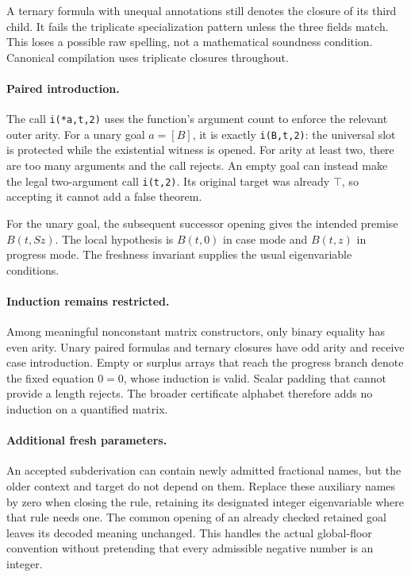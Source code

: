 \documentclass[11pt,letterpaper]{article}
\theoremstyle{definition}
\theoremstyle{remark}
\begin{document}
A ternary formula with unequal annotations still denotes the closure
of its third child.  It fails the triplicate specialization pattern
unless the three fields match.  This loses a possible raw spelling,
not a mathematical soundness condition.  Canonical compilation uses
triplicate closures throughout.

\paragraph{Paired introduction.}
The call \texttt{i(*a,t,2)} uses the function's argument count to enforce
the relevant outer arity.  For a unary goal $a=[B]$, it is exactly
\texttt{i(B,t,2)}: the universal slot is protected while the
existential witness is opened.  For arity at least two, there are too
many arguments and the call rejects.  An empty goal can instead make
the legal two-argument call \texttt{i(t,2)}.  Its original target was
already $\top$, so accepting it cannot add a false theorem.

For the unary goal, the subsequent successor opening gives the intended
premise $B(t,Sz)$.  The local hypothesis is $B(t,0)$ in case mode and
$B(t,z)$ in progress mode.  The freshness invariant supplies the
usual eigenvariable conditions.

\paragraph{Induction remains restricted.}
Among meaningful nonconstant matrix constructors, only binary equality
has even arity.  Unary paired formulas and ternary closures have odd
arity and receive case introduction.  Empty or surplus arrays that
reach the progress branch denote the fixed equation $0=0$, whose
induction is valid.  Scalar padding that cannot provide a length
rejects.  The broader certificate alphabet therefore adds no induction
on a quantified matrix.

\paragraph{Additional fresh parameters.}
An accepted subderivation can contain newly admitted fractional names,
but the older context and target do not depend on them.  Replace these
auxiliary names by zero when closing the rule, retaining its designated
integer eigenvariable where that rule needs one.  The common opening
of an already checked retained goal leaves its decoded meaning
unchanged.  This handles the actual global-floor convention without
pretending that every admissible negative number is an integer.
\end{document}
